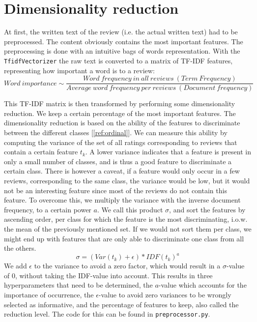 \documentclass[a4paper,12pt]{article}
\begin{document}
\section{Dimensionality reduction}
At first, the written text of the review (i.e. the actual written text) had to be preprocessed. The content obviously contains the most important features. The preprocessing is done with an intuitive bags of words representation. With the \texttt{TfidfVectorizer} the raw text is converted to a matrix of TF-IDF features, representing how important a word is to a review:\\
\begin{equation}
Word\ importance \sim \frac{Word\ frequency\ in\ all\ reviews\ (Term\ Frequency)}{Average\ word\ frequency\ per\ reviews\ (Document\ frequency)}
\end{equation}

This TF-IDF matrix is then transformed by performing some dimensionality reduction. We keep a certain percentage of the most important features. The dimensionality reduction is based on the ability of the features to discriminate between the different classes [\ref{ref:ordinal}]. We can measure this ability by computing the variance of the set of all ratings corresponding to reviews that contain a certain feature $t_{k}$. A lower variance indicates that a feature is present in only a small number of classes, and is thus a good feature to discriminate a certain class. There is however a caveat, if a feature would only occur in a few reviews, corresponding to the same class, the variance would be low, but it would not be an interesting feature since most of the reviews do not contain this feature. To overcome this, we multiply the variance with the inverse document frequency, to a certain power $a$. We call this product $\sigma$, and sort the features by ascending order, per class for which the feature is the most discriminating, i.o.w. the mean of the previously mentioned set. If we would not sort them per class, we might end up with features that are only able to discriminate one class from all the others.
\begin{equation}
    \sigma = (Var(t_{k})+\epsilon)*IDF(t_{k})^a
\end{equation}
We add $\epsilon$ to the variance to avoid a zero factor, which would result in a $\sigma$-value of 0, without taking the IDF-value into account. This results in three hyperparameters that need to be determined, the $a$-value which accounts for the importance of occurrence, the $\epsilon$-value to avoid zero variances to be wrongly selected as informative, and the percentage of features to keep, also called the reduction level. The code for this can be found in \texttt{preprocessor.py}.
\end{document}
